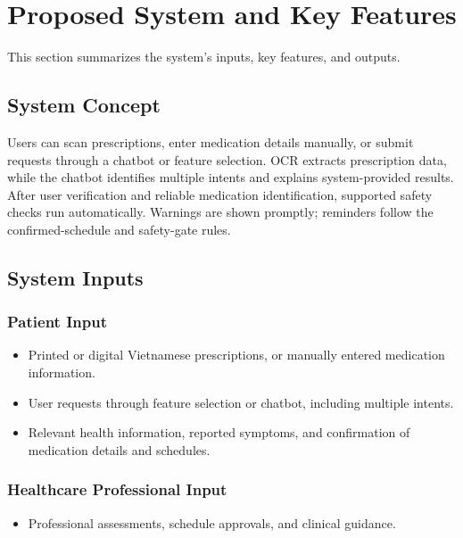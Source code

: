 \section{Proposed System and Key Features}

This section summarizes the system's inputs, key features, and outputs.

\subsection{System Concept}

Users can scan prescriptions, enter medication details manually, or submit requests through a chatbot or feature selection. OCR extracts prescription data, while the chatbot identifies multiple intents and explains system-provided results. After user verification and reliable medication identification, supported safety checks run automatically. Warnings are shown promptly; reminders follow the confirmed-schedule and safety-gate rules.

\subsection{System Inputs}

\subsubsection{Patient Input}

\begin{itemize}
    \item Printed or digital Vietnamese prescriptions, or manually entered medication information.

    \item User requests through feature selection or chatbot, including multiple intents.

    \item Relevant health information, reported symptoms, and confirmation of medication details and schedules.
\end{itemize}

\subsubsection{Healthcare Professional Input}

\begin{itemize}
    \item Professional assessments, schedule approvals, and clinical guidance.
\end{itemize}

